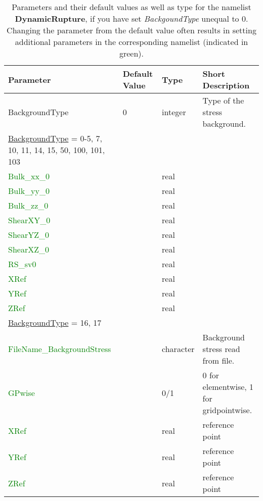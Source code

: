 \documentclass[12pt,twoside]{article}
\begin{document}
\begin{table}[H]
\caption{Parameters and their default values as well as type for the namelist \textbf{DynamicRupture}, 
         if you have set \textit{BackgoundType}
         unequal to 0. Changing the parameter from the default value often results in 
         setting additional parameters in the corresponding namelist (indicated in green).}
\begin{center}
\begin{tabular}{|p{4.8cm}|p{2.4cm}|p{2cm}|p{5cm}|}
\hline
Parameter & Default Value & Type & Short Description \\
\hline
\hline
BackgroundType & 0 & integer & Type of the stress background.\\
\hdashline
\uline{BackgroundType} = 0-5, 7, 10, 11, 14, 15, 50, 100, 101, 103 & & &\\
\textcolor{green}{Bulk\_xx\_0} & & real & \\
\textcolor{green}{Bulk\_yy\_0} & & real & \\
\textcolor{green}{Bulk\_zz\_0} & & real &\\
\textcolor{green}{ShearXY\_0} & & real &\\
\textcolor{green}{ShearYZ\_0} & & real &\\
\textcolor{green}{ShearXZ\_0} & & real &\\
\textcolor{green}{RS\_sv0} & & real &\\
\textcolor{green}{XRef} & & real &\\
\textcolor{green}{YRef} & & real &\\
\textcolor{green}{ZRef} & & real &\\
\hdashline
\uline{BackgroundType} = 16, 17 & & &\\
\textcolor{green}{FileName\_BackgroundStress} & & character & Background stress read from file.\\
\textcolor{green}{GPwise} & & 0/1 & 0 for elementwise, 1 for gridpointwise.\\
\textcolor{green}{XRef} & & real & reference point\\
\textcolor{green}{YRef} & & real & reference point\\
\textcolor{green}{ZRef} & & real & reference point\\
\hline
\end{tabular}
\end{center}
\label{bt-table}
\end{table}

\newpage
\end{document}
